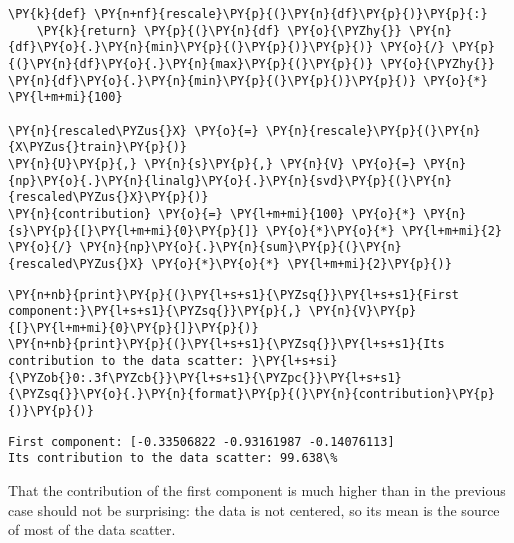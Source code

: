     \begin{tcolorbox}[breakable, size=fbox, boxrule=1pt, pad at break*=1mm,colback=cellbackground, colframe=cellborder]
\begin{Verbatim}[commandchars=\\\{\}]
\PY{k}{def} \PY{n+nf}{rescale}\PY{p}{(}\PY{n}{df}\PY{p}{)}\PY{p}{:}
    \PY{k}{return} \PY{p}{(}\PY{n}{df} \PY{o}{\PYZhy{}} \PY{n}{df}\PY{o}{.}\PY{n}{min}\PY{p}{(}\PY{p}{)}\PY{p}{)} \PY{o}{/} \PY{p}{(}\PY{n}{df}\PY{o}{.}\PY{n}{max}\PY{p}{(}\PY{p}{)} \PY{o}{\PYZhy{}} \PY{n}{df}\PY{o}{.}\PY{n}{min}\PY{p}{(}\PY{p}{)}\PY{p}{)} \PY{o}{*} \PY{l+m+mi}{100}

\PY{n}{rescaled\PYZus{}X} \PY{o}{=} \PY{n}{rescale}\PY{p}{(}\PY{n}{X\PYZus{}train}\PY{p}{)}
\PY{n}{U}\PY{p}{,} \PY{n}{s}\PY{p}{,} \PY{n}{V} \PY{o}{=} \PY{n}{np}\PY{o}{.}\PY{n}{linalg}\PY{o}{.}\PY{n}{svd}\PY{p}{(}\PY{n}{rescaled\PYZus{}X}\PY{p}{)}
\PY{n}{contribution} \PY{o}{=} \PY{l+m+mi}{100} \PY{o}{*} \PY{n}{s}\PY{p}{[}\PY{l+m+mi}{0}\PY{p}{]} \PY{o}{*}\PY{o}{*} \PY{l+m+mi}{2} \PY{o}{/} \PY{n}{np}\PY{o}{.}\PY{n}{sum}\PY{p}{(}\PY{n}{rescaled\PYZus{}X} \PY{o}{*}\PY{o}{*} \PY{l+m+mi}{2}\PY{p}{)}
\end{Verbatim}
\end{tcolorbox}

    \begin{tcolorbox}[breakable, size=fbox, boxrule=1pt, pad at break*=1mm,colback=cellbackground, colframe=cellborder]
\begin{Verbatim}[commandchars=\\\{\}]
\PY{n+nb}{print}\PY{p}{(}\PY{l+s+s1}{\PYZsq{}}\PY{l+s+s1}{First component:}\PY{l+s+s1}{\PYZsq{}}\PY{p}{,} \PY{n}{V}\PY{p}{[}\PY{l+m+mi}{0}\PY{p}{]}\PY{p}{)}
\PY{n+nb}{print}\PY{p}{(}\PY{l+s+s1}{\PYZsq{}}\PY{l+s+s1}{Its contribution to the data scatter: }\PY{l+s+si}{\PYZob{}0:.3f\PYZcb{}}\PY{l+s+s1}{\PYZpc{}}\PY{l+s+s1}{\PYZsq{}}\PY{o}{.}\PY{n}{format}\PY{p}{(}\PY{n}{contribution}\PY{p}{)}\PY{p}{)}
\end{Verbatim}
\end{tcolorbox}

    \begin{Verbatim}[commandchars=\\\{\}]
First component: [-0.33506822 -0.93161987 -0.14076113]
Its contribution to the data scatter: 99.638\%
    \end{Verbatim}
    
   That the contribution of the first component is much higher than in the previous case should not be surprising: the data is not centered, so its mean is the source of most of the data scatter.

